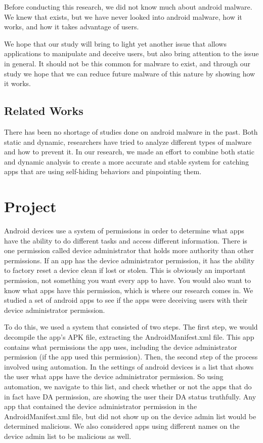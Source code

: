 \documentclass[10pt,twocolumn,letterpaper]{article}
\begin{document}
Before conducting this research, we did not know much about android malware. We knew that exists, but we have never looked into android malware, how it works, and how it takes advantage of users.

We hope that our study will bring to light yet another issue that allows applications to manipulate and deceive users, but also bring attention to the issue in general. It should not be this common for malware to exist, and through our study we hope that we can reduce future malware of this nature by showing how it works.


\subsection{Related Works}

There has been no shortage of studies done on android malware in the past. Both static and dynamic, researchers have tried to analyze different types of malware and how to prevent it. In our research, we made an effort to combine both static and dynamic analysis to create a more accurate and stable system for catching apps that are using self-hiding behaviors and pinpointing them.

\section{Project}

Android devices use a system of permissions in order to determine what apps have the ability to do different tasks and access different information. There is one permission called device administrator that holds more authority than other permissions. If an app has the device administrator permission, it has the ability to factory reset a device clean if lost or stolen. This is obviously an important permission, not something you want every app to have. You would also want to know what apps have this permission, which is where our research comes in. We studied a set of android apps to see if the apps were deceiving users with their device administrator permission.

To do this, we used a system that consisted of two steps. The first step, we would decompile the app’s APK file, extracting the AndroidManifest.xml file. This app contains what permissions the app uses, including the device administrator permission (if the app used this permission). Then, the second step of the process involved using automation. In the settings of android devices is a list that shows the user what apps have the device administrator permission. So using automation, we navigate to this list, and check whether or not the apps that do in fact have DA permission, are showing the user their DA status truthfully. Any app that contained the device administrator permission in the AndroidManifest.xml file, but did not show up on the device admin list would be determined malicious. We also considered apps using different names on the device admin list to be malicious as well.
\end{document}
